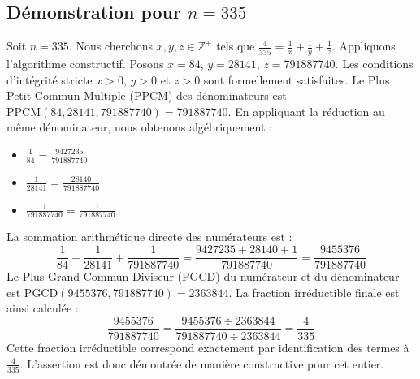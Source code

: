 \documentclass[11pt,a4paper]{article}
\begin{document}
\subsection{Démonstration pour $n = 335$}
Soit $n = 335$. Nous cherchons $x, y, z \in \mathbb{Z}^{+}$ tels que $\frac{4}{335} = \frac{1}{x} + \frac{1}{y} + \frac{1}{z}$.
Appliquons l'algorithme constructif. Posons $x = 84$, $y = 28141$, $z = 791887740$.
Les conditions d'intégrité stricte $x > 0$, $y > 0$ et $z > 0$ sont formellement satisfaites.
Le Plus Petit Commun Multiple (PPCM) des dénominateurs est $\text{PPCM}(84, 28141, 791887740) = 791887740$.
En appliquant la réduction au même dénominateur, nous obtenons algébriquement :
\begin{itemize}
    \item $\frac{1}{84} = \frac{9427235}{791887740}$
    \item $\frac{1}{28141} = \frac{28140}{791887740}$
    \item $\frac{1}{791887740} = \frac{1}{791887740}$
\end{itemize}
La sommation arithmétique directe des numérateurs est :
$$ \frac{1}{84} + \frac{1}{28141} + \frac{1}{791887740} = \frac{9427235 + 28140 + 1}{791887740} = \frac{9455376}{791887740} $$
Le Plus Grand Commun Diviseur (PGCD) du numérateur et du dénominateur est $\text{PGCD}(9455376, 791887740) = 2363844$.
La fraction irréductible finale est ainsi calculée :
$$ \frac{9455376}{791887740} = \frac{9455376 \div 2363844}{791887740 \div 2363844} = \frac{4}{335} $$
Cette fraction irréductible correspond exactement par identification des termes à $\frac{4}{335}$. L'assertion est donc démontrée de manière constructive pour cet entier.
\end{document}
